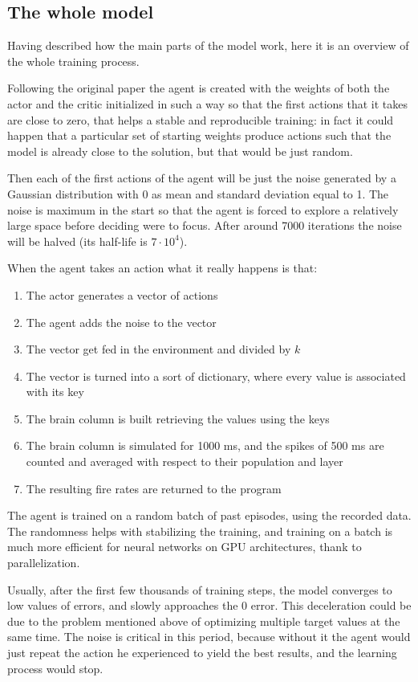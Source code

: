 \subsection{The whole model}
Having described how the main parts of the model work, here it is an overview of the whole training process.

Following the original paper \cite{lillicrap} the agent is created with the weights of both the actor and the critic initialized in such a way so that the first actions that it takes are close to zero, that helps a stable and reproducible training: in fact it could happen that a particular set of starting weights produce actions such that the model is already close to the solution, but that would be just random. 

Then each of the first actions of the agent will be just the noise generated by a Gaussian distribution with 0 as mean and standard deviation equal to 1. The noise is maximum in the start so that the agent is forced to explore a relatively large space before deciding were to focus. After around 7000 iterations the noise will be halved (its half-life is $7\cdot10^4$).

When the agent takes an action what it really happens is that: 
\begin{enumerate}[noitemsep]
	\item The actor generates a vector of actions
	\item The agent adds the noise to the vector
	\item The vector get fed in the environment and divided by $k$
	\item The vector is turned into a sort of dictionary, where every value is associated with its key
	\item The brain column is built retrieving the values using the keys
	\item The brain column is simulated for 1000 ms, and the spikes of 500 ms are counted and averaged with respect to their population and layer
	\item The resulting fire rates are returned to the program
\end{enumerate}

The agent is trained on a random batch of past episodes, using the recorded data. The randomness helps with stabilizing the training, and training on a batch is much more efficient for neural networks on GPU architectures, thank to parallelization.

Usually, after the first few thousands of training steps, the model converges to low values of errors, and slowly approaches the 0 error. This deceleration could be due to the problem mentioned above of optimizing multiple target values at the same time. The noise is critical in this period, because without it the agent would just repeat the action he experienced to yield the best results, and the learning process would stop.

